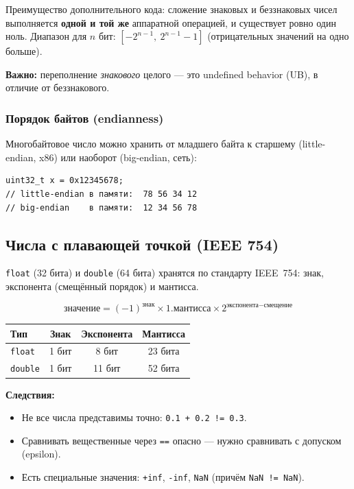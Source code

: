 Преимущество дополнительного кода: сложение знаковых и беззнаковых чисел
выполняется \textbf{одной и той же} аппаратной операцией, и существует ровно один
ноль. Диапазон для $n$ бит: $[-2^{n-1},\ 2^{n-1} - 1]$ (отрицательных значений на
одно больше).

\textbf{Важно:} переполнение \textit{знакового} целого --- это
undefined behavior (UB), в отличие от беззнакового.

\subsubsection{Порядок байтов (endianness)}

Многобайтовое число можно хранить от младшего байта к старшему (little-endian,
x86) или наоборот (big-endian, сеть):

\begin{lstlisting}[numbers=none]
uint32_t x = 0x12345678;
// little-endian в памяти:  78 56 34 12
// big-endian    в памяти:  12 34 56 78
\end{lstlisting}

\subsection{Числа с плавающей точкой (IEEE 754)}

\texttt{float} (32 бита) и \texttt{double} (64 бита) хранятся по стандарту
IEEE~754: знак, экспонента (смещённый порядок) и мантисса.

\[
\text{значение} = (-1)^{\text{знак}} \times 1.\text{мантисса} \times 2^{\text{экспонента} - \text{смещение}}
\]

\begin{center}
\begin{tabular}{lccc}
\toprule
\textbf{Тип} & \textbf{Знак} & \textbf{Экспонента} & \textbf{Мантисса} \\
\midrule
\texttt{float}  & 1 бит & 8 бит  & 23 бита \\
\texttt{double} & 1 бит & 11 бит & 52 бита \\
\bottomrule
\end{tabular}
\end{center}

\textbf{Следствия:}
\begin{itemize}[leftmargin=2em]
    \item Не все числа представимы точно: \texttt{0.1 + 0.2 != 0.3}.
    \item Сравнивать вещественные через \texttt{==} опасно --- нужно сравнивать
          с допуском (epsilon).
    \item Есть специальные значения: \texttt{+inf}, \texttt{-inf}, \texttt{NaN}
          (причём \texttt{NaN != NaN}).
\end{itemize}

